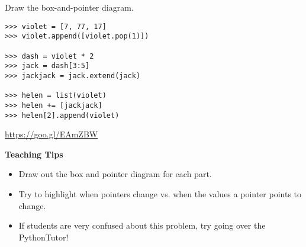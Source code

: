 \begin{blocksection}
\question Draw the box-and-pointer diagram. \\

\begin{lstlisting}
>>> violet = [7, 77, 17]
>>> violet.append([violet.pop(1)])

>>> dash = violet * 2
>>> jack = dash[3:5]
>>> jackjack = jack.extend(jack)

>>> helen = list(violet)
>>> helen += [jackjack]
>>> helen[2].append(violet)
\end{lstlisting}

\begin{solution}[1in]
\url{https://goo.gl/EAmZBW}
\end{solution}
\end{blocksection}

\begin{guide}
    \textbf{Teaching Tips}
    \begin{itemize}
       \item Draw out the box and pointer diagram for each part.
       \item Try to highlight when pointers change vs. when the values a pointer points to change.
       \item If students are very confused about this problem, try going over the PythonTutor!
    \end{itemize}
 \end{guide}
